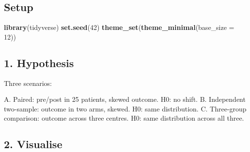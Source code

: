 \documentclass[
]{article}
\newenvironment{Shaded}{\begin{snugshade}}{\end{snugshade}}
\newcommand{\AttributeTok}[1]{\textcolor[rgb]{0.13,0.29,0.53}{#1}}
\newcommand{\DecValTok}[1]{\textcolor[rgb]{0.00,0.00,0.81}{#1}}
\newcommand{\FunctionTok}[1]{\textcolor[rgb]{0.13,0.29,0.53}{\textbf{#1}}}
\newcommand{\NormalTok}[1]{#1}
\begin{document}
\subsection{Setup}\label{setup}

\begin{Shaded}
\begin{Highlighting}[]
\FunctionTok{library}\NormalTok{(tidyverse)}
\FunctionTok{set.seed}\NormalTok{(}\DecValTok{42}\NormalTok{)}
\FunctionTok{theme\_set}\NormalTok{(}\FunctionTok{theme\_minimal}\NormalTok{(}\AttributeTok{base\_size =} \DecValTok{12}\NormalTok{))}
\end{Highlighting}
\end{Shaded}

\subsection{1. Hypothesis}\label{hypothesis}

Three scenarios:

A. Paired: pre/post in 25 patients, skewed outcome. H0: no shift. B.
Independent two-sample: outcome in two arms, skewed. H0: same
distribution. C. Three-group comparison: outcome across three centres.
H0: same distribution across all three.

\subsection{2. Visualise}\label{visualise}
\end{document}
